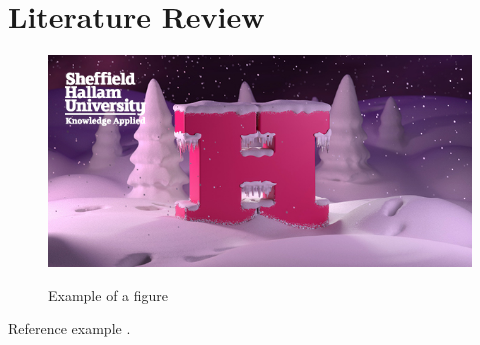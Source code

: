 \chapter{Literature Review}

\begin{figure}[!htb]
    \caption{Example of a figure}
    \centering 
    \includegraphics[scale=0.5]{images/img.png}
    \label{figure:img}
\end{figure}


Reference example \cite{Abreu:2010}.